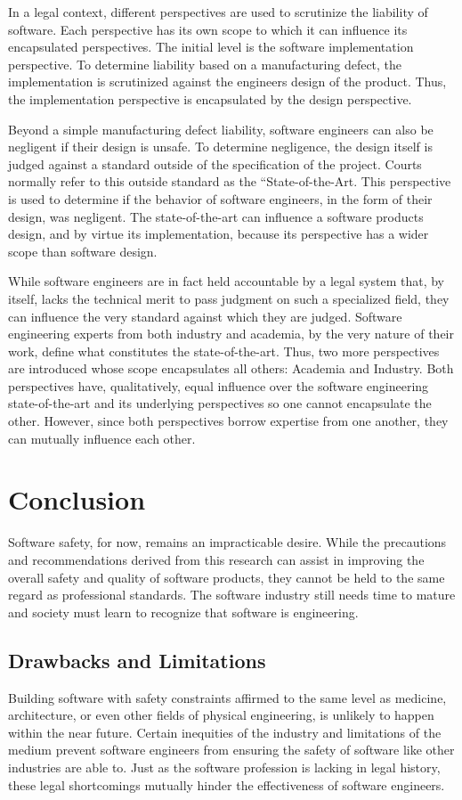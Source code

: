 \documentclass[12pt]{report}
\begin{document}
In a legal context, different perspectives are used to scrutinize the liability of software. Each perspective has its own scope to which it can influence its encapsulated perspectives. The initial level is the software implementation perspective. To determine liability based on a manufacturing defect, the implementation is scrutinized against the engineers design of the product. Thus, the implementation perspective is encapsulated by the design perspective. 

Beyond a simple manufacturing defect liability, software engineers can also be negligent if their design is unsafe. To determine negligence, the design itself is judged against a standard outside of the specification of the project. Courts normally refer to this outside standard as the ``State-of-the-Art. This perspective is used to determine if the behavior of software engineers, in the form of their design, was negligent. The state-of-the-art can influence a software products design, and by virtue its implementation, because its perspective has a wider scope than software design. 

While software engineers are in fact held accountable by a legal system that, by itself, lacks the technical merit to pass judgment on such a specialized field, they can influence the very standard against which they are judged. Software engineering experts from both industry and academia, by the very nature of their work, define what constitutes the state-of-the-art. Thus, two more perspectives are introduced whose scope encapsulates all others: Academia and Industry. Both perspectives have, qualitatively, equal influence over the software engineering state-of-the-art and its underlying perspectives so one cannot encapsulate the other. However, since both perspectives borrow expertise from one another, they can mutually influence each other. 

\chapter{Conclusion} 
Software safety, for now, remains an impracticable desire. While the precautions and recommendations derived from this research can assist in improving the overall safety and quality of software products, they cannot be held to the same regard as professional standards. The software industry still needs time to mature and society must learn to recognize that software is engineering. 

\section{Drawbacks and Limitations} 
Building software with safety constraints affirmed to the same level as medicine, architecture, or even other fields of physical engineering, is unlikely to happen within the near future. Certain inequities of the industry and limitations of the medium prevent software engineers from ensuring the safety of software like other industries are able to. 
Just as the software profession is lacking in legal history, these legal shortcomings mutually hinder the effectiveness of software engineers. 
\end{document}
